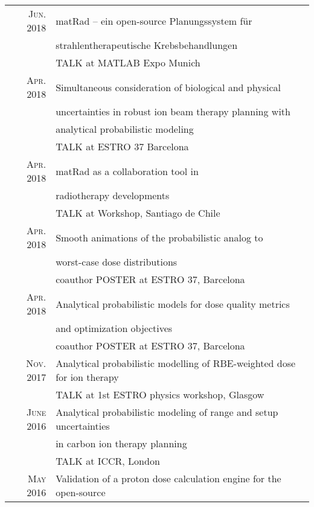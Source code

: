 \documentclass[a4paper,10pt]{article}
\begin{document}
\begin{tabular}{rl}
\textsc{Jun.} 2018  & matRad – ein open-source Planungssystem für   \\
                                & strahlentherapeutische Krebsbehandlungen     \\
                                & TALK at MATLAB Expo Munich \\ \hline
\textsc{Apr.} 2018 & Simultaneous consideration of biological and physical   \\
                                & uncertainties in robust ion beam therapy planning with\\
                                 & analytical probabilistic modeling  \\
                                & TALK at ESTRO 37 Barcelona  \\ \hline                                   
\textsc{Apr.} 2018 & matRad as a collaboration tool in \\
                                & radiotherapy developments \\
                                &  TALK at Workshop, Santiago de Chile\\ \hline
\textsc{Apr.} 2018 & Smooth animations of the probabilistic analog to   \\
                                & worst-case dose distributions \\
                                & coauthor POSTER at ESTRO 37, Barcelona \\ \hline
\textsc{Apr.} 2018 & Analytical probabilistic models for dose quality metrics\\
                                &   and optimization objectives\\
                                &  coauthor POSTER at ESTRO 37, Barcelona  \\ \hline
\textsc{Nov.} 2017 & Analytical probabilistic modelling of RBE-weighted dose for ion therapy\\
                                &   TALK at 1st ESTRO physics workshop, Glasgow  \\ \hline
\textsc{June} 2016 & Analytical probabilistic modeling of range and setup uncertainties\\
                                &  in carbon ion therapy planning\\
                                & TALK at ICCR, London\\ \hline
\textsc{May} 2016 & Validation of a proton dose calculation engine for the open-source \\

\end{tabular}
\end{document}
